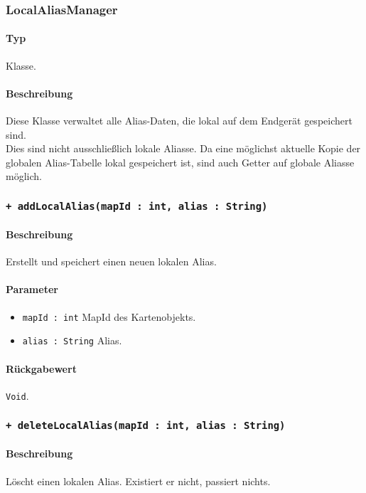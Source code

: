 \subsubsection{LocalAliasManager}\label{App_AddAlias_LocalAliasManager}
\paragraph*{Typ}
Klasse.
\paragraph*{Beschreibung}
Diese Klasse verwaltet alle Alias-Daten, die lokal auf dem Endgerät gespeichert sind.\\
Dies sind nicht ausschließlich lokale Aliasse. Da eine möglichst aktuelle Kopie der 
globalen Alias-Tabelle lokal gespeichert ist, sind auch Getter auf globale Aliasse möglich.

\subsubsection*{\texttt{+ addLocalAlias(mapId : int, alias : String)}}\label{App_AddAlias_LocalAliasManager_addLocalAlias}%
\paragraph*{Beschreibung}
Erstellt und speichert einen neuen lokalen Alias.
\paragraph*{Parameter}
\begin{itemize}
    \item \texttt{mapId : int} MapId des Kartenobjekts.
    \item \texttt{alias : String} Alias.
\end{itemize}
\paragraph*{Rückgabewert}
\texttt{Void}.

\subsubsection*{\texttt{+ deleteLocalAlias(mapId : int, alias : String)}}\label{App_AddAlias_LocalAliasManager_deleteLocalAlias}%
\paragraph*{Beschreibung}
Löscht einen lokalen Alias. Existiert er nicht, passiert nichts.
